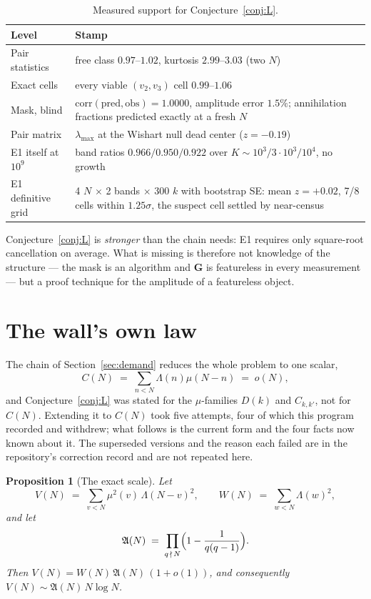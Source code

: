 \documentclass[11pt,a4paper]{article}
\theoremstyle{plain}
\newtheorem{proposition}[theorem]{Proposition}
\theoremstyle{definition}
\begin{document}
\begin{table}[t]
\centering\small
\begin{tabular}{p{}p{}}
\hline
Level & Stamp\\
\hline
Pair statistics & free class $0.97$--$1.02$, kurtosis $2.99$--$3.03$
 (two $N$)\\
Exact cells & every viable $(v_2,v_3)$ cell $0.99$--$1.06$\\
Mask, blind & $\mathrm{corr}(\text{pred},\text{obs}) = 1.0000$,
 amplitude error $1.5\%$; annihilation fractions predicted exactly at
 a fresh $N$\\
Pair matrix & $\lambda_{\max}$ at the Wishart null dead center
 ($z = -0.19$)\\
E1 itself at $10^9$ & band ratios $0.966 / 0.950 / 0.922$ over
 $K \sim 10^3/3\cdot10^3/10^4$, no growth\\
E1 definitive grid & 4 $N$ $\times$ 2 bands $\times$ 300 $k$ with
 bootstrap SE: mean $z = +0.02$, 7/8 cells within $1.25\sigma$, the
 suspect cell settled by near-census\\
\hline
\end{tabular}
\caption{Measured support for Conjecture~\ref{conj:L}.}
\label{tab:L}
\end{table}

Conjecture~\ref{conj:L} is \emph{stronger} than the chain needs: E1
requires only square-root cancellation on average. What is missing is
therefore not knowledge of the structure --- the mask is an algorithm
and $\mathbf G$ is featureless in every measurement --- but a proof
technique for the amplitude of a featureless object.

\section{The wall's own law}\label{sec:wall}

The chain of Section~\ref{sec:demand} reduces the whole problem to one
scalar,
\[
  C(N) \;=\; \sum_{n<N}\Lambda(n)\mu(N-n) \;=\; o(N),
\]
and Conjecture~\ref{conj:L} was stated for the $\mu$-families
$D(k)$ and $C_{k,k'}$, not for $C(N)$. Extending it to $C(N)$ took five
attempts, four of which this program recorded and withdrew; what
follows is the current form and the four facts now known about it. The
superseded versions and the reason each failed are in the repository's
correction record and are not repeated here.

\begin{proposition}[The exact scale]\label{prop:V}
Let
\[
  V(N) \;=\; \sum_{v<N}\mu^2(v)\,\Lambda(N-v)^2,
  \qquad
  W(N) \;=\; \sum_{w<N}\Lambda(w)^2,
\]
and let
\[
  \mathfrak A(N) \;=\; \prod_{q\,\nmid\,N}\Bigl(1-\frac{1}{q(q-1)}\Bigr).
\]
Then $V(N) = W(N)\,\mathfrak A(N)\,(1+o(1))$, and consequently
$V(N) \sim \mathfrak A(N)\,N\log N$.
\end{proposition}
\end{document}
